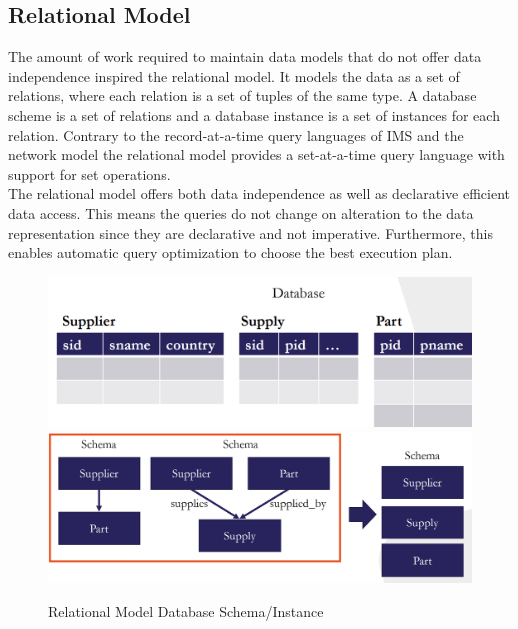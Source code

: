 \subsection{Relational Model}
The amount of work required to maintain data models that do not offer data independence inspired the relational model. It models the data as a set of relations, where each relation is a set of tuples of the same type. A database scheme is a set of relations and a database instance is a set of instances for each relation. Contrary to the record-at-a-time query languages of IMS and the network model the relational model provides a set-at-a-time query language with support for set operations. \\
The relational model offers both data independence as well as declarative efficient data access. This means the queries do not change on alteration to the data representation since they are declarative and not imperative. Furthermore, this enables automatic query optimization to choose the best execution plan.
\begin{figure}[H]
\centering
\includegraphics[width=.4\textwidth]{images/Relational_Model_1.PNG}\\
\includegraphics[width=.4\textwidth]{images/Relational_Model_2.PNG}
\label{Relational_Model_instance}
\caption{Relational Model Database Schema/Instance}
\end{figure}

